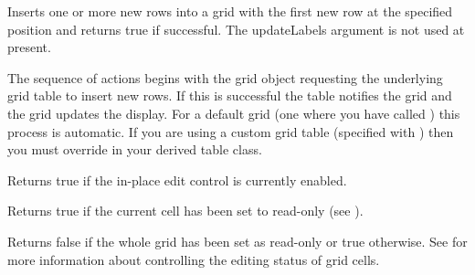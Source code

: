 \label{wxgridinsertrows}


Inserts one or more new rows into a grid with the first new row at the specified
position and returns true if successful. The updateLabels argument is not used at
present.

The sequence of actions begins with the grid object requesting the underlying grid
table to insert new rows. If this is successful the table notifies the grid and the
grid updates the display. For a default grid (one where you have called 
) this process is automatic. If you are
using a custom grid table (specified with )
then you must override 
 in your derived
table class.



\label{wxgridiscelleditcontrolenabled}


Returns true if the in-place edit control is currently enabled.



\label{wxgridiscurrentcellreadonly}


Returns true if the current cell has been set to read-only
(see ).



\label{wxgridiseditable}


Returns false if the whole grid has been set as read-only or true otherwise.
See  for more information about
controlling the editing status of grid cells.



\label{wxgridisinselection}



